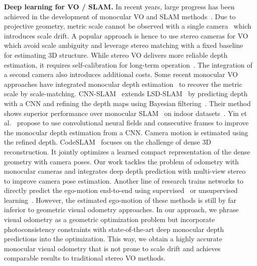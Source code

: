 \documentclass[runningheads]{llncs}
\begin{document}
\textbf{Deep learning for VO / SLAM.} 
In recent years, large progress has been achieved in the development of monocular VO and SLAM methods~\cite{mur2017orb,engel2014lsd,engel2017direct,newcombe2011dtam}.
Due to projective geometry, metric scale cannot be observed with a single camera~\cite{strasdat2010scale} which introduces scale drift. 
A popular approach is hence to use stereo cameras for VO~\cite{engel2015large,engel2017direct,mur2017orb} which avoid scale ambiguity and leverage stereo matching with a fixed baseline for estimating 3D structure. 
While stereo VO delivers more reliable depth estimation, it requires self-calibration for long-term operation~\cite{dang2009continuous,yin2017scale}. The integration of a second camera also introduces additional costs.
Some recent monocular VO approaches have integrated monocular depth estimation~\cite{yin2017scale,tateno2017cnn} to recover the metric scale by scale-matching.
CNN-SLAM~\cite{tateno2017cnn} extends LSD-SLAM~\cite{engel2014lsd} by predicting depth with a CNN and refining the depth maps using Bayesian filtering~\cite{engel2014lsd,engel2013iccv}. 
Their method shows superior performance over monocular 
SLAM~\cite{engel2014lsd,mur2015orb,yang2018challenges,pizzoli2014remode} on 
indoor datasets~\cite{handa2014benchmark,sturm2012benchmark}. Yin et 
al.~\cite{yin2017scale} propose to use convolutional neural fields and 
consecutive frames to improve the monocular depth estimation from a CNN. 
Camera motion is estimated using the refined depth. 
CodeSLAM~\cite{bloesch2018codeslam} focuses on the challenge of dense 3D reconstruction. 
It jointly optimizes a learned compact representation of the dense geometry with camera poses. 
Our work tackles the problem of odometry with monocular cameras and integrates deep depth prediction with multi-view stereo to improve camera pose estimation.
Another line of research trains networks to directly predict the ego-motion end-to-end using supervised~\cite{wang2017deepvo} or unsupervised learning~\cite{zhou2017unsupervised,li2017undeepvo}.
However, the estimated ego-motion of these methods is still by far inferior to geometric visual odometry approaches.
In our approach, we phrase visual odometry as a geometric optimization problem but incorporate photoconsistency constraints with state-of-the-art deep monocular depth predictions into the optimization.
This way, we obtain a highly accurate monocular visual odometry that is not prone to scale drift and achieves comparable results to traditional stereo VO methods.

\end{document}
